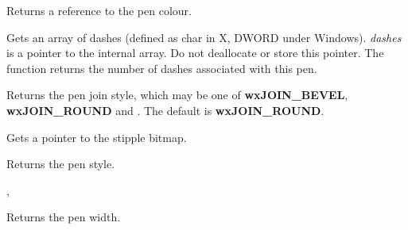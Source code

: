 
Returns a reference to the pen colour.



\label{wxpengetdashes}


Gets an array of dashes (defined as char in X, DWORD under Windows).
{\it dashes} is a pointer to the internal array. Do not deallocate or store this pointer.
The function returns the number of dashes associated with this pen.



\label{wxpengetjoin}


Returns the pen join style, which may be one of {\bf wxJOIN\_BEVEL}, {\bf wxJOIN\_ROUND} and
. The default is {\bf wxJOIN\_ROUND}.



\label{wxpengetstipple}


Gets a pointer to the stipple bitmap.



\label{wxpengetstyle}


Returns the pen style.


, 

\label{wxpengetwidth}


Returns the pen width.



